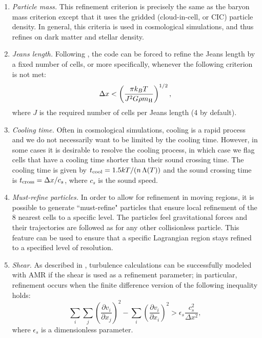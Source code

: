 \begin{enumerate}
\item{\em Particle mass.}  This refinement criterion is precisely the same as the baryon mass criterion except that it uses the gridded (cloud-in-cell, or CIC) particle density.  In general, this criteria is used in cosmological simulations, and thus refines on dark matter and stellar density.

\item{\em Jeans length.}  Following \cite{Truelove98}, the code can be forced to refine the Jeans length by a fixed number of cells, or more specifically, whenever the following criterion is not met:
\begin{equation}
\Delta x < \left( \frac{\pi k_B T}{J^2 G \rho \mh} \right)^{1/2},
\end{equation}
where $J$ is the required number of cells per Jeans length (4 by default).

\item{\em Cooling time.}  Often in cosmological simulations, cooling is a rapid process and we do not necessarily want to be limited by the cooling time.  However, in some cases it is desirable to resolve the cooling process, in which case we flag cells that have a cooling time shorter than their sound crossing time.  The cooling time is given by $t_{\rm cool} = 1.5 kT / (n\, \Lambda(T))$ and the sound crossing time is $t_{\rm cross} = \Delta x / c_s$, where $c_s$ is the sound speed.

\item{\em Must-refine particles.}  In order to allow for refinement in moving regions, it is possible to generate ``must-refine" particles that ensure local refinement of the 8 nearest cells to a specific level.  The particles feel gravitational forces and their trajectories are followed as for any other collisionless particle.  This feature can be used to ensure that a specific Lagrangian region stays refined to a specified level of resolution. 

\item{\em Shear.} As described in \citet{Kritsuk06}, turbulence calculations can be successfully modeled with AMR if the shear is used as a refinement parameter; in particular, refinement occurs when the finite difference version of the following inequality holds:
\begin{equation}
\sum_i \sum_j \left( \frac{\partial v_i}{\partial x_j} \right)^2 -  \sum_i \left( \frac{\partial v_i}{\partial x_i} \right)^2
> \epsilon_s \frac{c_s^2}{\Delta x^2},
\end{equation}
where $\epsilon_s$ is a dimensionless parameter.


\end{enumerate}
